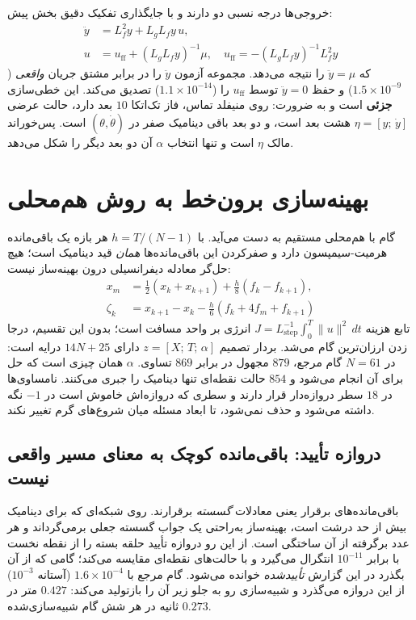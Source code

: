 \documentclass[10pt,twocolumn]{article}
\newcommand{\en}[1]{\lr{#1}}
\begin{document}
خروجی‌ها درجه نسبی دو دارند و با جایگذاری تفکیک دقیق بخش پیش:
\begin{align}
\ddot y &= L_f^2 y + L_gL_f y\,u, \nonumber\\
u &= u_{\mathrm{ff}} + (L_gL_fy)^{-1}\mu,\quad
u_{\mathrm{ff}} = -(L_gL_fy)^{-1}L_f^2y
\label{eq:iolin}
\end{align}
که $\ddot y=\mu$ را نتیجه می‌دهد. مجموعه آزمون $\ddot y$ را در برابر مشتق جریان \emph{واقعی}
($1.5\times10^{-9}$) و حفظ $\ddot y=0$ توسط $u_{\mathrm{ff}}$ را ($1.1\times10^{-14}$) تصدیق
می‌کند. این خطی‌سازی \textbf{جزئی} است و به ضرورت: روی منیفلد تماس، فاز تک‌اتکا $10$ بعد دارد،
حالت عرضی $\eta=[y;\,\dot y]$ هشت بعد است، و دو بعد باقی دینامیک صفر در $(\theta,\dot\theta)$
است. پس‌خوراند مالک $\eta$ است و تنها انتخاب $\alpha$ آن دو بعد دیگر را شکل می‌دهد.

\section{بهینه‌سازی برون‌خط به روش هم‌محلی}
گام با هم‌محلی مستقیم \cite{betts2010practical} به دست می‌آید. با $h=T/(N-1)$ هر بازه یک
باقی‌مانده هرمیت-سیمپسون دارد و صفرکردن این باقی‌مانده‌ها \emph{همان} قید دینامیک است؛ هیچ
حل‌گر معادله دیفرانسیلی درون بهینه‌ساز نیست:
\begin{align}
x_m &= \tfrac12(x_k + x_{k+1}) + \tfrac{h}{8}(f_k - f_{k+1}), \nonumber\\
\zeta_k &= x_{k+1} - x_k - \tfrac{h}{6}(f_k + 4f_m + f_{k+1})
\label{eq:hs}
\end{align}
تابع هزینه $J = L_{\mathrm{step}}^{-1}\int_0^T \|u\|^2\,dt$ انرژی بر واحد مسافت است؛ بدون این
تقسیم، درجا زدن ارزان‌ترین گام می‌شد. بردار تصمیم $z=[X;\,T;\,\alpha]$ دارای $14N+25$ درایه
است: در $N=61$ گام مرجع، $879$ مجهول در برابر $869$ تساوی. $\alpha$ همان چیزی است که حل برای
آن انجام می‌شود و $854$ حالت نقطه‌ای تنها دینامیک را جبری می‌کنند. نامساوی‌ها در $18$ سطر
دروازه‌دار قرار دارند و سطری که دروازه‌اش خاموش است در $-1$ نگه داشته می‌شود و حذف نمی‌شود، تا
ابعاد مسئله میان شروع‌های گرم تغییر نکند.

\subsection{دروازه تأیید: باقی‌مانده کوچک به معنای مسیر واقعی نیست}
باقی‌مانده‌های برقرار یعنی معادلات \emph{گسسته} برقرارند. روی شبکه‌ای که برای دینامیک بیش از حد
درشت است، بهینه‌ساز به‌راحتی یک جواب گسسته جعلی برمی‌گرداند و هر عدد برگرفته از آن ساختگی است.
از این رو دروازه تأیید حلقه بسته را از نقطه نخست با \en{RelTol} برابر $10^{-11}$
انتگرال می‌گیرد و با حالت‌های نقطه‌ای مقایسه می‌کند؛ گامی که از آن بگذرد در این گزارش
\emph{تأییدشده} خوانده می‌شود. گام مرجع با $1.6\times10^{-4}$ (آستانه
$10^{-3}$) از این دروازه می‌گذرد و شبیه‌سازی رو به جلو زیر \en{PD} آن را بازتولید می‌کند:
$0.427$ متر در $0.273$ ثانیه در هر شش گام شبیه‌سازی‌شده.
\end{document}
